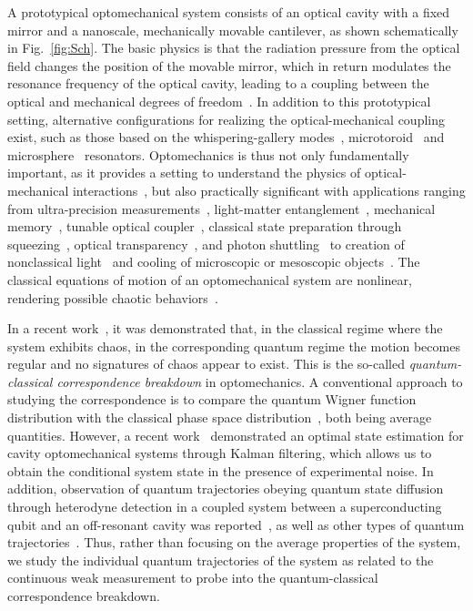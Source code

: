 \documentclass[12pt]{wlscirep}
\begin{document}
A prototypical optomechanical system consists of an optical cavity with 
a fixed mirror and a nanoscale, mechanically movable cantilever, as shown 
schematically in Fig.~\ref{fig:Sch}. The basic physics is that the radiation 
pressure from the optical field changes the position of the movable mirror, 
which in return modulates the resonance frequency of the optical cavity, 
leading to a coupling between the optical and mechanical degrees of 
freedom~\cite{MG:2009,AKM:2014}. In addition to this prototypical setting, 
alternative configurations for realizing the optical-mechanical coupling 
exist, such as those based on the whispering-gallery modes~\cite{ASY:2014}, 
microtoroid~\cite{GLPV:2010} and microsphere~\cite{AKM:2014} resonators. 
Optomechanics is thus not only fundamentally important, as it provides a 
setting to understand the physics of optical-mechanical 
interactions~\cite{LPXBHT:2008,LPT:2009,AKM:2014}, but also 
practically significant with applications ranging from ultra-precision 
measurements~\cite{MG:2009,JARAK:2009,VTBCH:2010}, light-matter 
entanglement~\cite{VGFBTGVZA:2007,GHVA:2009,ME:2009},
mechanical memory~\cite{BPLPT:2011}, tunable optical coupler~\cite{FPLT:2011}, 
classical state preparation through squeezing~\cite{PFT:2014,PFT:2015},
optical transparency~\cite{FFPT:2015}, and photon shuttling~\cite{LL:2014} to 
creation of nonclassical light~\cite{BBSPBS:2012,QCHM:2012} and cooling of
microscopic or mesoscopic objects~\cite{TDLHACSWLS:2011,CASHKGAP:2011}.
The classical equations of motion of an optomechanical system are 
nonlinear, rendering possible chaotic behaviors~\cite{CV:2007,CCV:2007}. 

In a recent work~\cite{BAF:2015}, it was demonstrated that, in the 
classical regime where the system exhibits chaos, in the corresponding 
quantum regime the motion becomes regular and no signatures of chaos 
appear to exist. This is the so-called {\em quantum-classical 
correspondence breakdown} in optomechanics.
A conventional approach to studying the correspondence is 
to compare the quantum Wigner function distribution with the classical 
phase space distribution~\cite{KRSL:2007,KLRS:2008,QCHM:2012}, both 
being average quantities. However, a recent work~\cite{WHHRHA:2015} 
demonstrated an optimal state estimation for cavity optomechanical 
systems through Kalman filtering, which allows us to obtain the conditional 
system state in the presence of experimental noise. In addition, 
observation of quantum trajectories obeying quantum state diffusion 
through heterodyne detection in a coupled system between a superconducting 
qubit and an off-resonant cavity was reported~\cite{CSBSMRH:2016}, as
well as other types of quantum trajectories~\cite{GKGBDHBRH:2007,
YZSWDCWH:2008,VLMZFBA:2010,NBSRFHWJ:2010,VSS:2011,MWMS:2013,
HSMSGBSAFG:2013,VPSAWBGSHC:2014,FMDS:2014,WCDJMS:2014,LRTETJWSD:2014}.
Thus, rather than focusing on the average properties of the system, we 
study the individual quantum trajectories of the system as related to the 
continuous weak measurement to probe into the quantum-classical 
correspondence breakdown.
\end{document}
